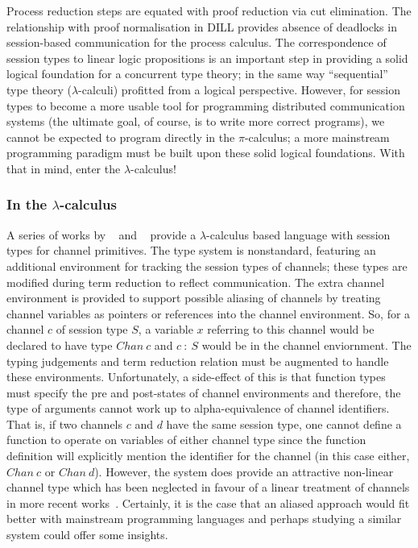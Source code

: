 \documentclass{mprop}
\newcommand{\1}{\textbf{1}\xspace}
\begin{document}
Process reduction steps are equated with proof reduction via cut
elimination. The relationship with proof normalisation in DILL provides
absence of deadlocks in session-based communication for the process
calculus. The correspondence of session types to linear logic propositions is
an important step in providing a solid logical foundation for a concurrent
type theory; in the same way ``sequential'' type theory ($\lambda$-calculi)
profitted from a logical perspective. However, for session types to become a
more usable tool for programming distributed communication systems (the
ultimate goal, of course, is to write more correct programs), we cannot be
expected to program directly in the $\pi$-calculus; a more mainstream
programming paradigm must be built upon these solid logical foundations. With
that in mind, enter the $\lambda$-calculus!

\subsubsection{In the \texorpdfstring{$\lambda$}{lambda}-calculus}
\label{sec:lam}

A series of works by \citeauthor{Gay:2003:STI}~\cite{Gay:2003:STI} and
\citeauthor{Vasconcelos:2006:TCM}~\cite{Vasconcelos:2006:TCM} provide a
$\lambda$-calculus based language with session types for channel
primitives. The type system is nonstandard, featuring an additional
environment for tracking the session types of channels; these types are
modified during term reduction to reflect communication. The extra channel
environment is provided to support possible aliasing of channels by treating
channel variables as pointers or references into the channel environment. So,
for a channel $c$ of session type $S$, a variable $x$ referring to this
channel would be declared to have type $Chan~c$ and $c~:~S$ would be in the
channel enviornment. The typing judgements and term reduction relation must be
augmented to handle these environments. Unfortunately, a side-effect of this
is that function types must specify the pre and post-states of channel
environments and therefore, the type of arguments cannot work up to
alpha-equivalence of channel identifiers. That is, if two channels $c$ and $d$
have the same session type, one cannot define a function to operate on
variables of either channel type since the function definition will explicitly
mention the identifier for the channel (in this case either, $Chan~c$ or
$Chan~d$). However, the system does provide an attractive non-linear channel
type which has been neglected in favour of a linear treatment of channels in
more recent
works~\cite{Gay:2010:LAST,Mazurak:2010:LCC,Wadler:2012}. Certainly, it is the
case that an aliased approach would fit better with mainstream programming
languages and perhaps studying a similar system could offer some insights.
\end{document}
